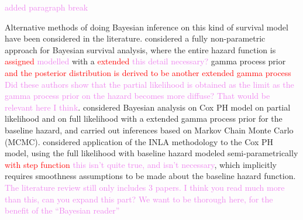 \documentclass[ba]{imsart}
\newcommand{\highlight}[1]{\textcolor{red}{#1}}
\newcommand{\alex}[1]{\textcolor{violet}{{ }#1}}
\begin{document}
\alex{added paragraph break}

Alternative methods of doing Bayesian inference on this kind of survival model have been considered in the literature. \cite{BayesianNonpara} considered a fully non-parametric approach for Bayesian survival analysis, where the entire hazard function is \highlight{assigned}\alex{modelled} with a \highlight{extended}\alex{this detail necessary?} gamma process prior \highlight{and the posterior distribution is derived to be another extended gamma process}\alex{Did these authors show that the partial likelihood is obtained as the limit as the gamma process prior on the hazard becomes more diffuse? That would be relevant here I think}. \cite{BayesianPartialMCMC} considered Bayesian analysis on Cox PH model on partial likelihood and on full likelihood with a extended gamma process prior for the baseline hazard, and carried out inferences based on Markov Chain Monte Carlo (MCMC). \cite{inlacoxph} considered application of the INLA methodology to the Cox PH model, using the full likelihood with baseline hazard modeled semi-parametrically \highlight{with step function}\alex{this isn't quite true, and isn't necessary}, which implicitly requires smoothness assumptions to be made about the baseline hazard function.\alex{The literature review still only includes 3 papers. I think you read much more than this, can you expand this part? We want to be thorough here, for the benefit of the ``Bayesian reader''}
\end{document}
